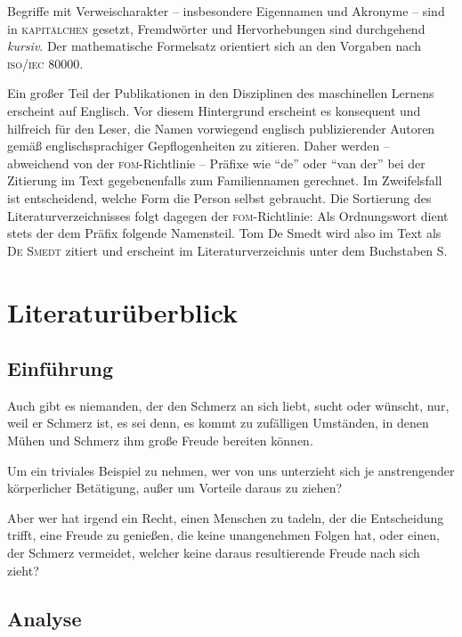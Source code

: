 Begriffe mit Verweischarakter -- insbesondere Eigennamen und
Akronyme -- sind in \textsc{kapitälchen} gesetzt, Fremdwörter und
Hervorhebungen sind durchgehend \emph{kursiv}. Der mathematische
Formelsatz orientiert sich an den Vorgaben nach \textsc{iso/iec}
80000.

Ein großer Teil der Publikationen in den Disziplinen des
maschinellen Lernens erscheint auf Englisch. Vor diesem Hintergrund
erscheint es konsequent und hilfreich für den Leser, die Namen
vorwiegend englisch publizierender Autoren gemäß englischsprachiger
Gepflogenheiten zu zitieren. Daher werden -- abweichend von der
\textsc{fom}-Richtlinie -- Präfixe wie \enquote{de} oder
\enquote{van der} bei der Zitierung im Text gegebenenfalls zum
Familiennamen gerechnet. Im Zweifelsfall ist entscheidend, welche
Form die Person selbst gebraucht. Die Sortierung des
Literaturverzeichnisses folgt dagegen der \textsc{fom}-Richtlinie:
Als Ordnungswort dient stets der dem Präfix folgende Namensteil. Tom
De Smedt wird also im Text als \textsc{De Smedt} zitiert und
erscheint im Literaturverzeichnis unter dem Buchstaben S.

\hypertarget{literaturuxfcberblick}{%
\section{Literaturüberblick}\label{literaturuxfcberblick}}

\hypertarget{einfuxfchrung}{%
\subsection{Einführung}\label{einfuxfchrung}}

Auch gibt es niemanden, der den Schmerz an sich liebt, sucht oder
wünscht, nur, weil er Schmerz ist, es sei denn, es kommt zu
zufälligen Umständen, in denen Mühen und Schmerz ihm große Freude
bereiten können.

Um ein triviales Beispiel zu nehmen, wer von uns unterzieht sich je
anstrengender körperlicher Betätigung, außer um Vorteile daraus zu
ziehen?

Aber wer hat irgend ein Recht, einen Menschen zu tadeln, der die
Entscheidung trifft, eine Freude zu genießen, die keine unangenehmen
Folgen hat, oder einen, der Schmerz vermeidet, welcher keine daraus
resultierende Freude nach sich zieht?

\hypertarget{analyse}{%
\subsection{Analyse}\label{analyse}}

